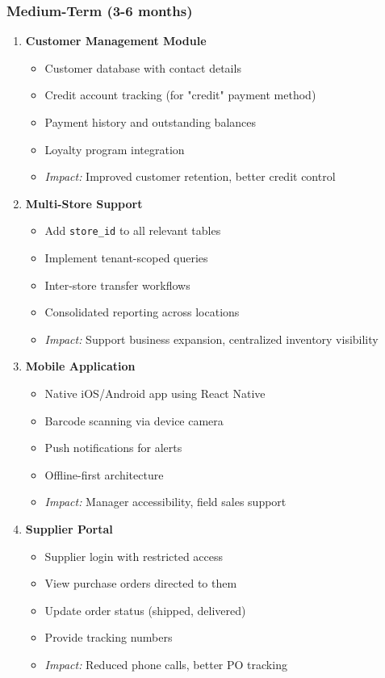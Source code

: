 \subsubsection{Medium-Term (3-6 months)}

\begin{enumerate}[leftmargin=*]
    \item \textbf{Customer Management Module}
    \begin{itemize}
        \item Customer database with contact details
        \item Credit account tracking (for "credit" payment method)
        \item Payment history and outstanding balances
        \item Loyalty program integration
        \item \textit{Impact:} Improved customer retention, better credit control
    \end{itemize}
    
    \item \textbf{Multi-Store Support}
    \begin{itemize}
        \item Add \texttt{store\_id} to all relevant tables
        \item Implement tenant-scoped queries
        \item Inter-store transfer workflows
        \item Consolidated reporting across locations
        \item \textit{Impact:} Support business expansion, centralized inventory visibility
    \end{itemize}
    
    \item \textbf{Mobile Application}
    \begin{itemize}
        \item Native iOS/Android app using React Native
        \item Barcode scanning via device camera
        \item Push notifications for alerts
        \item Offline-first architecture
        \item \textit{Impact:} Manager accessibility, field sales support
    \end{itemize}
    
    \item \textbf{Supplier Portal}
    \begin{itemize}
        \item Supplier login with restricted access
        \item View purchase orders directed to them
        \item Update order status (shipped, delivered)
        \item Provide tracking numbers
        \item \textit{Impact:} Reduced phone calls, better PO tracking
    \end{itemize}
\end{enumerate}

